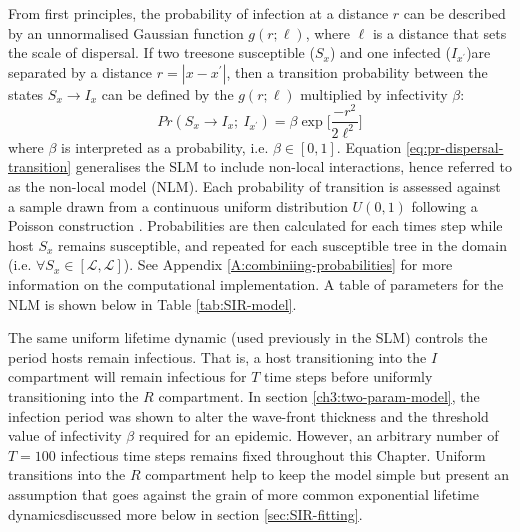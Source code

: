 From first principles, the probability of infection at a distance $r$ can be described by an unnormalised Gaussian function $g(r; \ell)$,
where $\ell$ is a distance that sets the scale of dispersal. 
If two trees\textemdash one susceptible ($S_x$) and one infected ($I_{x^\prime}$)\textemdash are separated by a distance $r=|x - x^\prime|$, then a transition probability between the states $S_x \rightarrow I_x$ can be defined by the $g(r; \ell)$ multiplied by infectivity $\beta$:
\begin{equation}
\label{eq:pr-dispersal-transition}
    Pr(S_{x} \rightarrow I_{x} ;\ I_{x^{\prime}} ) = \beta \exp\Big[\frac{-r^2}{2\ell^2}\Big]
\end{equation}
where $\beta$ is interpreted as a probability, i.e. $\beta \in [0, 1]$. 
Equation \ref{eq:pr-dispersal-transition} generalises the SLM to include non-local interactions, hence referred to as the non-local model (NLM).
Each probability of transition is assessed against a sample drawn from a continuous uniform distribution $U(0, 1)$ following a Poisson construction \cite{cook2008constructing}. 
Probabilities are then calculated for each times step while host $S_x$ 
remains susceptible, and repeated for each susceptible tree in the domain (i.e. $\forall S_x \in [\mathcal{L}, \mathcal{L}]$).
See Appendix \ref{A:combiniing-probabilities} for more information on the computational implementation. A table of parameters for the NLM is shown below in Table \ref{tab:SIR-model}.

The same uniform lifetime dynamic (used previously in the SLM) controls the period hosts remain infectious.
That is, a host transitioning into the $I$ compartment will remain infectious for $T$ time steps before uniformly transitioning into the $R$ compartment.
In section \ref{ch3:two-param-model}, the infection period was shown to alter the wave-front thickness and the threshold value of infectivity $\beta$ required for an epidemic. 
However, an arbitrary number of $T=100$ infectious time steps remains fixed throughout this Chapter.
Uniform transitions into the $R$ compartment help to keep the model simple but present an assumption that goes against the grain of more common exponential lifetime dynamics\textemdash discussed more below in section \ref{sec:SIR-fitting}.

